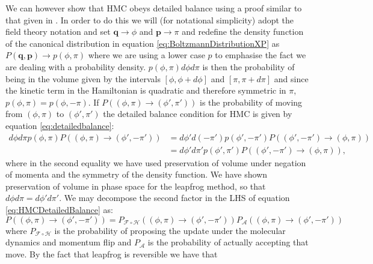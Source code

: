 \documentclass[12pt]{article}
\begin{document}
            We can however show that HMC obeys detailed balance using a proof similar to that given in \cite{duane_kennedy_pendleton_roweth_1987}. In order to do this we will (for notational simplicity) adopt the field theory notation and set $\bm{q}\rightarrow \phi$ and $\bm{p}\rightarrow \pi$ and redefine the density function of the canonical distribution in equation \ref{eq:BoltzmannDistributionXP} as $P\left(\bm{q},\bm{p}\right) \rightarrow p\left(\phi,\pi\right)$ where we are using a lower case $p$ to emphasise the fact we are dealing with a probability density. $p\left(\phi,\pi\right)d\phi d\pi$ is then the probability of being in the volume given by the intervals $\left[\phi,\phi+d\phi\right]$ and  $\left[\pi,\pi+d\pi\right]$ and since the kinetic term in the Hamiltonian is quadratic and therefore symmetric in $\pi$, $p\left(\phi,\pi\right)=p\left(\phi,-\pi\right)$. If $P\left(\left(\phi,\pi\right)\rightarrow\left(\phi',\pi'\right)\right)$ is the probability of moving from $\left(\phi,\pi\right)$ to $\left(\phi',\pi'\right)$ the detailed balance condition for HMC is given by equation \ref{eq:detailedbalance}:
            \begin{align}
                \label{eq:HMCDetailedBalance}
                d\phi d\pi p\left(\phi,\pi\right) P\left(\left(\phi,\pi\right)\rightarrow\left(\phi',-\pi'\right)\right) & = d\phi' d\left(-\pi'\right) p\left(\phi',-\pi'\right) P\left(\left(\phi',-\pi'\right)\rightarrow\left(\phi,\pi\right)\right) \\
                & = d\phi' d\pi' p\left(\phi',\pi'\right) P\left(\left(\phi',-\pi'\right)\rightarrow\left(\phi,\pi\right)\right),
            \end{align}
            where in the second equality we have used preservation of volume under negation of momenta and the symmetry of the density function. We have shown preservation of volume in phase space for the leapfrog method, so that $d\phi d\pi = d\phi' d\pi'$. We may decompose the second factor in the LHS of equation \ref{eq:HMCDetailedBalance} as:
            \begin{equation}
                P\left(\left(\phi,\pi\right) \rightarrow \left(\phi',-\pi'\right)\right) = P_{\mathcal{F}\circ \mathcal{H}}\left(\left(\phi,\pi\right) \rightarrow \left(\phi',-\pi'\right)\right)P_{\mathcal{A}}\left(\left(\phi,\pi\right)\rightarrow \left(\phi',-\pi'\right)\right)
            \end{equation}
            where $P_{\mathcal{F}\circ \mathcal{H}}$ is the probability of proposing the update under the molecular dynamics and momentum flip and $P_\mathcal{A}$ is the probability of actually accepting that move. By the fact that leapfrog is reversible we have that
\end{document}
